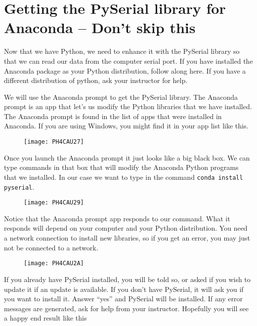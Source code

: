\section{Getting the PySerial library for Anaconda -- Don't skip this}

Now that we have Python, we need to enhance it with the PySerial library so that we can read our data from the computer serial port. If you have installed the Anaconda package as your Python distribution, follow along here. If you have a different distribution of python, ask your instructor for help.

We will use the Anaconda prompt to get the PySerial library. The Anaconda prompt is an app that let's us modify the Python libraries that we have installed. The Anaconda prompt is found in the list of apps that were installed in Anaconda. If you are using Windows, you might find it in your app list like this.

\begin{figure}[h!]
	\centering
	\texttt{[image: PH4CAU27]}
\end{figure}

Once you launch the Anaconda prompt it just looks like a big black box. 
We can type commands in that box that will modify the Anaconda Python programs that we installed. In our case we want to type in the command \texttt{conda install pyserial}.

\begin{figure}[h!]
	\centering
	\texttt{[image: PH4CAU29]}
\end{figure}

Notice that the Anaconda prompt app responds to our command. What it responds will depend on your computer and your Python distribution. You need a network connection to install new libraries, so if you get an error, you may just not be connected to a network.

\begin{figure}[h!]
	\centering
	\texttt{[image: PH4CAU2A]}
\end{figure}

If you already have PySerial installed, you will be told so, or asked if you wish to update it if an update is available. If you don't have PySerial, it will ask you if you want to install it. Answer ``yes'' and PySerial will be installed. If any error messages are generated, ask for help from your instructor. Hopefully you will see a happy end result like this 

